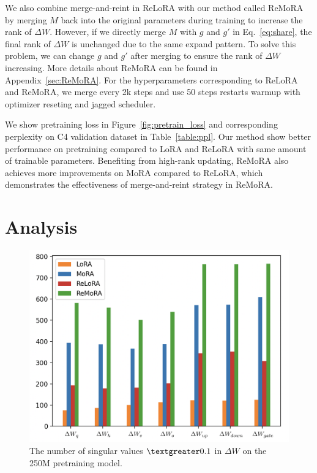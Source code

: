 \documentclass[11pt]{article}
\begin{document}
We also combine merge-and-reint in ReLoRA with our method called ReMoRA by merging $M$ back into the original parameters during training to increase the rank of $\Delta W$.
However, if we directly merge $M$ with $g$ and $g'$ in Eq.~\ref{eq:share}, the final rank of $\Delta W$ is unchanged due to the same expand pattern.
To solve this problem, we can change $g$ and $g'$ after merging to ensure the rank of $\Delta W$ increasing.
More details about ReMoRA can be found in Appendix~\ref{sec:ReMoRA}.
For the hyperparameters corresponding to ReLoRA and ReMoRA, we merge every 2k steps and use 50 steps restarts warmup with optimizer reseting and jagged scheduler.

We show pretraining loss in Figure~\ref{fig:pretrain_loss} and corresponding perplexity on C4 validation dataset in Table~\ref{table:ppl}.
Our method show better performance on pretraining compared to LoRA and ReLoRA with same amount of trainable parameters.
Benefiting from high-rank updating, ReMoRA also achieves more improvements on MoRA compared to ReLoRA, which
demonstrates the effectiveness of merge-and-reint strategy in ReMoRA.

\section{Analysis}

\begin{figure}[t]
\centering
    \includegraphics[width=1\columnwidth]{svd.png}
\caption{
  The number of singular values $\textgreater 0.1$ in $\Delta W$ on the 250M pretraining model.
  }
 \label{fig:svd}
\end{figure}
\end{document}

